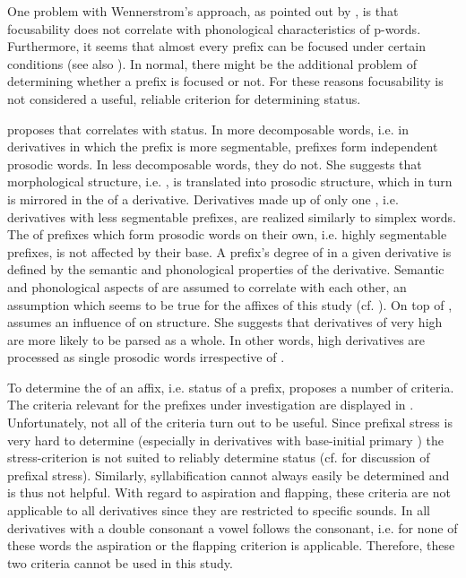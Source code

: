 One problem with Wennerstrom's approach, as pointed out by \citet[161f.]{Raffelsiefen.1999}, is that focusability does not correlate with phonological characteristics of p-words. Furthermore, it seems that almost every prefix can be focused under certain conditions (see also \citealt[Chapter 4]{Plag.2003}). In normal,  there might be the additional problem of determining whether a prefix is focused or not. For these reasons focusability is not considered a useful, reliable criterion for determining  status.

\cite{Raffelsiefen.1999} proposes that  correlates with  status. In more decomposable words, i.e. in derivatives in which the prefix is more segmentable, prefixes form independent prosodic words. In less decomposable words, they do not.
She suggests that morphological structure, i.e. , is translated into prosodic structure, which in turn is mirrored in the  of a derivative. Derivatives made up of only one , i.e. derivatives with less segmentable prefixes, are realized similarly to simplex words. The  of prefixes which form prosodic words on their own, i.e. highly segmentable prefixes, is not affected by their base. 
A prefix's degree of  in a given derivative is defined by the semantic and phonological properties of the derivative. 
Semantic and phonological aspects of  are assumed to correlate with each other, an assumption which seems to be true for the affixes of this study (cf. ). On top of , \citet[175f.]{Raffelsiefen.1999} assumes an influence of  on  structure. 
She suggests that derivatives of very high  are more likely to be parsed as a whole. In other words, high  derivatives are processed as single prosodic words irrespective of .


To determine the  of an affix, i.e.  status of a prefix, \cite{Raffelsiefen.1999} proposes a number of criteria. The criteria relevant for the prefixes under investigation are displayed in . Unfortunately, not all of the criteria turn out to be useful. Since {prefixal stress} is very hard to determine (especially in derivatives with base-initial primary ) the stress-criterion is not suited to reliably determine  status (cf.  for discussion of {prefixal stress}). Similarly, syllabification cannot always easily be determined and is thus not helpful. 
With regard to aspiration and flapping, these criteria are not applicable to all derivatives since they are restricted to specific sounds. In all derivatives with a double consonant a vowel follows the consonant, i.e. for none of these words the aspiration or the flapping criterion is applicable. Therefore, these two criteria cannot be used in this study.

